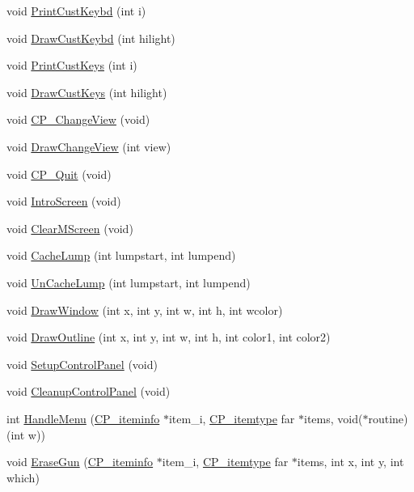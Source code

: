 \begin{DoxyCompactItemize}
void \hyperlink{WL__MENU_8C_adcd1d339231514422736a0da10f0b92b}{PrintCustKeybd} (int i)
\item 
void \hyperlink{WL__MENU_8C_a55ce148269754602b0c814448911b27d}{DrawCustKeybd} (int hilight)
\item 
void \hyperlink{WL__MENU_8C_aff9049f7e08b5e6a90e8da5bb81b287a}{PrintCustKeys} (int i)
\item 
void \hyperlink{WL__MENU_8C_ace6221928d863a720c5674fad34b11fa}{DrawCustKeys} (int hilight)
\item 
void \hyperlink{WL__MENU_8C_a95a4685a2d017477e6a863344b787642}{CP\_\-ChangeView} (void)
\item 
void \hyperlink{WL__MENU_8C_ad799719f482b9ac14dab51685b6d635a}{DrawChangeView} (int view)
\item 
void \hyperlink{WL__MENU_8C_ad29825b90b8a92ca853643f18f868705}{CP\_\-Quit} (void)
\item 
void \hyperlink{WL__MENU_8C_a98260bc22d24f0075ec75a375a865b1d}{IntroScreen} (void)
\item 
void \hyperlink{WL__MENU_8C_a7a8e53f3f469cbf79c3f55807761d3bb}{ClearMScreen} (void)
\item 
void \hyperlink{WL__MENU_8C_a03aae71ea1eb201f2e7e4b0408c1c426}{CacheLump} (int lumpstart, int lumpend)
\item 
void \hyperlink{WL__MENU_8C_ae68019294ac4f3a9df949035a4c36cf8}{UnCacheLump} (int lumpstart, int lumpend)
\item 
void \hyperlink{WL__MENU_8C_a904e939ab3e905847095245ec694d845}{DrawWindow} (int x, int y, int w, int h, int wcolor)
\item 
void \hyperlink{WL__MENU_8C_a932353c4f637452b49ee6e1a4c382bf5}{DrawOutline} (int x, int y, int w, int h, int color1, int color2)
\item 
void \hyperlink{WL__MENU_8C_a3c358410161fc65eb8b58e7e7e47b409}{SetupControlPanel} (void)
\item 
void \hyperlink{WL__MENU_8C_adaff6c2a2e08ddb9a2e1bc122ea0c546}{CleanupControlPanel} (void)
\item 
int \hyperlink{WL__MENU_8C_ad290f8e33560355805666460ffa302b0}{HandleMenu} (\hyperlink{structCP__iteminfo}{CP\_\-iteminfo} $\ast$item\_\-i, \hyperlink{structCP__itemtype}{CP\_\-itemtype} far $\ast$items, void($\ast$routine)(int w))
\item 
void \hyperlink{WL__MENU_8C_ac0d2328b065d28f9db037264a780fab4}{EraseGun} (\hyperlink{structCP__iteminfo}{CP\_\-iteminfo} $\ast$item\_\-i, \hyperlink{structCP__itemtype}{CP\_\-itemtype} far $\ast$items, int x, int y, int which)

\end{DoxyCompactItemize}
